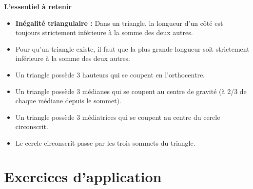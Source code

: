 \begin{summarybox}
	\textbf{L'essentiel à retenir}
	\begin{itemize}
		\item \textbf{Inégalité triangulaire :} Dans un triangle, la longueur d'un côté est toujours strictement inférieure à la somme des deux autres.
		\item Pour qu'un triangle existe, il faut que la plus grande longueur soit strictement inférieure à la somme des deux autres.
		\item Un triangle possède 3 hauteurs qui se coupent en l'orthocentre.
		\item Un triangle possède 3 médianes qui se coupent au centre de gravité (à 2/3 de chaque médiane depuis le sommet).
		\item Un triangle possède 3 médiatrices qui se coupent au centre du cercle circonscrit.
		\item Le cercle circonscrit passe par les trois sommets du triangle.
	\end{itemize}
\end{summarybox}

\section{Exercices d'application}

